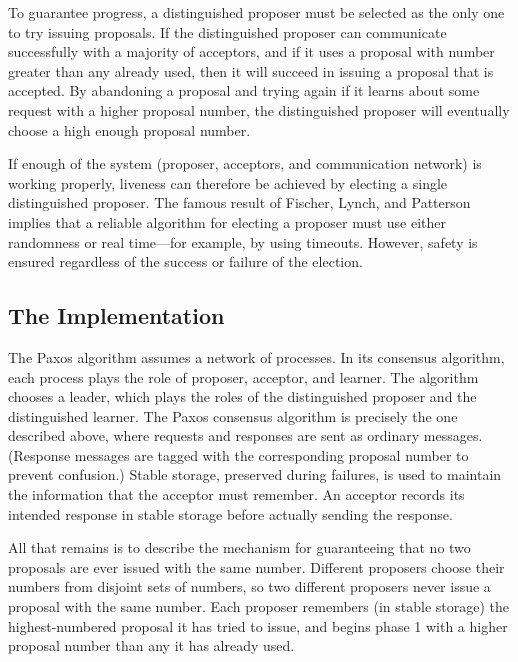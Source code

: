To guarantee progress, a distinguished proposer must be selected as the only one to try issuing proposals.
If the distinguished proposer can communicate successfully with a majority of acceptors, and if it uses a proposal with number greater than any already used, then it will succeed in issuing a proposal that is accepted.
By abandoning a proposal and trying again if it learns about some request with a higher proposal number, the distinguished proposer will eventually choose a high enough proposal number.

If enough of the system (proposer, acceptors, and communication network) is working properly, liveness can therefore be achieved by electing a single distinguished proposer.
The famous result of Fischer, Lynch, and Patterson \cite{FischerLynchPaterson85} implies that a reliable algorithm for electing a proposer must use either randomness or real time—for example, by using timeouts.
However, safety is ensured regardless of the success or failure of the election.

\subsection{The Implementation}
The Paxos algorithm \cite{Lamport98} assumes a network of processes.
In its consensus algorithm, each process plays the role of proposer, acceptor, and learner.
The algorithm chooses a leader, which plays the roles of the distinguished
proposer and the distinguished learner.
The Paxos consensus algorithm is precisely the one described above, where requests and responses are sent as ordinary messages.
(Response messages are tagged with the corresponding proposal number to prevent confusion.)
Stable storage, preserved during failures, is used to maintain the information that the acceptor must remember.
An acceptor records its intended response in stable storage before actually sending the response.

All that remains is to describe the mechanism for guaranteeing that no two proposals are ever issued with the same number.
Different proposers choose their numbers from disjoint sets of numbers, so two different proposers never issue a proposal with the same number.
Each proposer remembers (in stable storage) the highest-numbered proposal it has tried to issue, and begins phase 1 with a higher proposal number than any it has already used.
